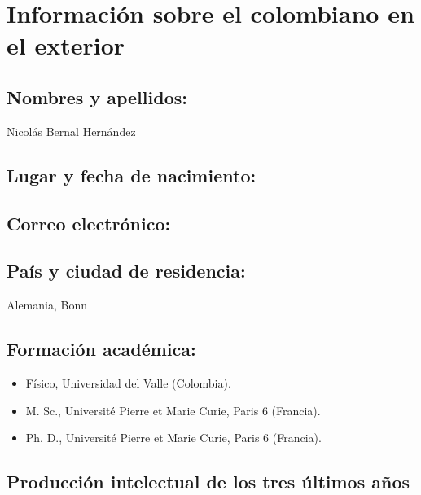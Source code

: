 \section{Información sobre el colombiano en el exterior}
\subsection{Nombres y apellidos: }
Nicolás Bernal Hernández
\subsection{Lugar y fecha de nacimiento: }
\fnbernal
\subsection{Correo electrónico: }
\embernal
\subsection{País y ciudad de residencia: }
Alemania, Bonn
\subsection{Formación académica:}
\begin{itemize}
\item Físico, Universidad del Valle (Colombia).
\item M. Sc.,  Université Pierre et Marie Curie, Paris 6 (Francia).
\item Ph. D.,  Université Pierre et Marie Curie, Paris 6 (Francia).
\end{itemize}
\subsection{Producción intelectual de los tres últimos años}
